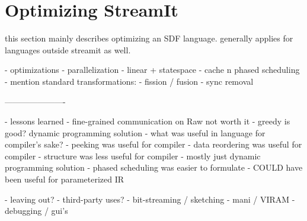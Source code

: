 \chapter{Optimizing StreamIt}
\label{chap:optimizing}

this section mainly describes optimizing an SDF language. generally
applies for languages outside streamit as well.

- optimizations
  - parallelization
  - linear + statespace
  - cache
  n phased scheduling
- mention standard transformations:
  - fission / fusion
  - sync removal

----------------------

- lessons learned
  - fine-grained communication on Raw not worth it
  - greedy is good?  dynamic programming solution
  - what was useful in language for compiler's sake?
   - peeking was useful for compiler
   - data reordering was useful for compiler
   - structure was less useful for compiler
     - mostly just dynamic programming solution
     - phased scheduling was easier to formulate
     - COULD have been useful for parameterized IR

- leaving out?
  - third-party uses?
    - bit-streaming / sketching
    - mani / VIRAM
  - debugging / gui's
